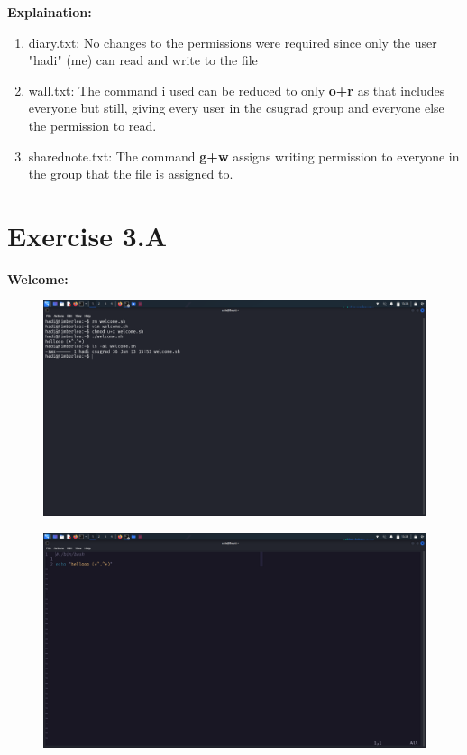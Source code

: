 \documentclass{article}
\numberwithin{equation}{subsection}
\begin{document}
	\textbf{Explaination:}
	\begin{enumerate}
		\item diary.txt: No changes to the permissions were required since only the
			user "hadi" (me) can read and write to the file

		\item wall.txt: The command i used can be reduced to only \textbf{o+r} as 
			that includes everyone but still, giving every user in the csugrad group
			and everyone else the permission to read.
		
		\item sharednote.txt: The command \textbf{g+w} assigns writing permission 
			to everyone in the group that the file is assigned to. 
	\end{enumerate}



	\newpage
	\section{Exercise 3.A}
	
	\textbf{Welcome:}

	\begin{figure}[H]
		\includegraphics[width=400pt]{images/e3qA/1.png}
	\end{figure}
	\begin{figure}[H]
		\includegraphics[width=400pt]{images/e3qA/2.png}
	\end{figure}
\end{document}
